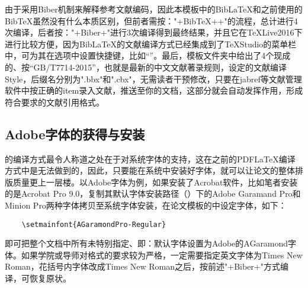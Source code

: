 由于采用Biber机制来解释参考文献编码，因此本模板中的Bib\LaTeX{}和之前使用的Bib\TeX{}虽然没有什么本质区别，但前者需按："+Bib\TeX{}++"的流程，总计进行4次编译，后者按："+Biber+"进行3次编译得到最终结果，并且它在\TeX{}Live2016下进行比较方便，因为Bib\LaTeX{}的文献编译方式已经集成到了\TeX{}Studio的菜单栏中，可为其在选项中设置快捷键，比如“”。最后，模板文件夹中给出了4个现成的、按“GB/T7714-2015”，也就是最新的中文文献著录规则，设定的文献编译Style，后缀名分别为".bbx"和".cbx"，无需读者干预修改，只要在jabref等文献管理软件中按正确的item录入文献，推送至你的文档，这部分就会自动发挥作用，形成符合要求的文献引用格式。

\subsection{Adobe字体的获得与安装}
的编译方式最令人称道之处在于对系统字体的支持，这在之前的PDF\LaTeX{}编译方式中是无法做到的，因此，只要能在系统中安装好字体，就可以让论文的整体排版质量更上一层楼。以Adobe字体为例，如果安装了Acrobat软件，比如笔者安装的是Acrobat Pro 9.0，复制其默认字体安装路径（）下的Adobe Garamand Pro和Minion Pro两种字体拷贝至系统字体安装，在论文模板的中设定字体，如下：
\begin{lstlisting}
	\setmainfont{AGaramondPro-Regular}
\end{lstlisting}
即可把整个文档中所有未特别指定、即：默认字体设置为Adobe的AGaramond字体。如果学院或导师对格式的要求较为严格，一定需要指定英文字体为Times New Roman，花括号内字体改成Times New Roman之后，按前述"+Biber+"方式编译，可恢复原状。

